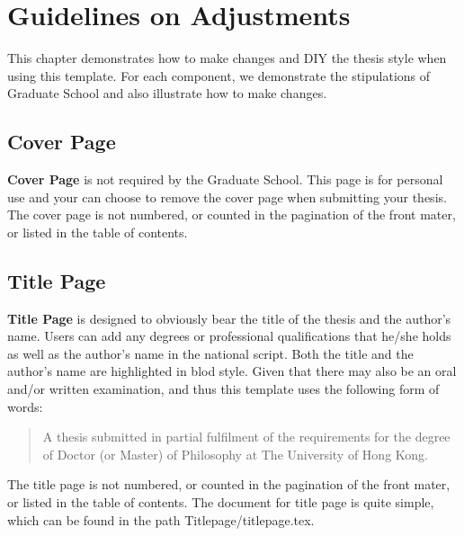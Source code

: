 
\chapter{Guidelines on Adjustments} %

\label{Chapter2} %



This chapter demonstrates how to make changes and DIY the thesis style when using this template. For each component, we demonstrate the stipulations of Graduate School and also illustrate how to make changes.

\section{Cover Page}
\textbf{Cover Page} is not required by the Graduate School. This page is for personal use and your can choose to remove the cover page when submitting your thesis. The cover page is not numbered, or counted in the pagination of the front mater, or listed in the table of contents.

\section{Title Page}
\textbf{Title Page} is designed to obviously bear the title of the thesis and the author's name. Users can add any degrees or professional qualifications that he/she holds as well as the author's name in the national script. Both the title and the author's name are highlighted in blod style. Given that there may also be an oral and/or written examination, and thus this template uses the following form of words:

\begin{quote}
A thesis submitted in partial fulfilment of the requirements for the degree of Doctor (or Master) of Philosophy at The University of Hong Kong.
\end{quote}

\noindent The title page is not numbered, or counted in the pagination of the front mater, or listed in the table of contents. The document for title page is quite simple, which can be found in the path \colorbox{gray!20}{Titlepage/titlepage.tex}.


